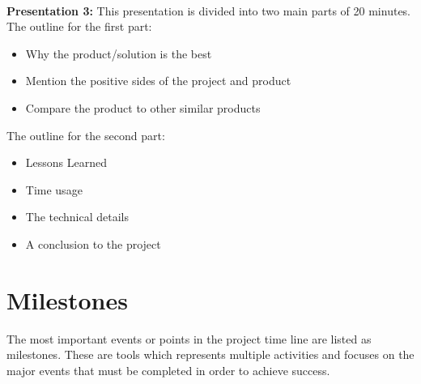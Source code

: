 \\
\textbf{Presentation 3:}
This presentation is divided into two main parts of 20 minutes. \\
The outline for the first part:
\begin{itemize}
  \item Why the product/solution is the best 
  \item Mention the positive sides of the project and product
  \item Compare the product to other similar products 
\end{itemize}
The outline for the second part:
\begin{itemize}
  \item Lessons Learned
  \item Time usage 
  \item The technical details
  \item A conclusion to the project 
\end{itemize} 



\clearpage

\section{Milestones}


The most important events or points in the project time line are listed as milestones. These are tools which represents multiple activities and focuses on the major events that must be completed in order to achieve success. \\


